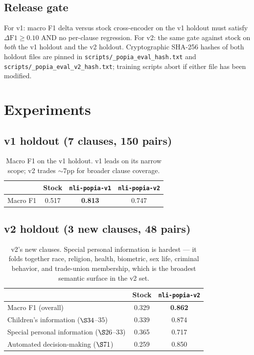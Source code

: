 \documentclass[11pt]{article}
\begin{document}
\subsection{Release gate}
For v1: macro F1 delta versus stock cross-encoder on the v1 holdout must satisfy $\Delta \mathrm{F1} \geq 0.10$ AND no per-clause regression. For v2: the same gate against stock on \emph{both} the v1 holdout and the v2 holdout. Cryptographic SHA-256 hashes of both holdout files are pinned in \texttt{scripts/\_popia\_eval\_hash.txt} and \texttt{scripts/\_popia\_eval\_v2\_hash.txt}; training scripts abort if either file has been modified.

\section{Experiments}
\label{sec:eval}

\subsection{v1 holdout (7 clauses, 150 pairs)}
\begin{table}[h]
\centering
\begin{tabular}{lccc}
\toprule
& Stock & \texttt{nli-popia-v1} & \texttt{nli-popia-v2} \\
\midrule
Macro F1 & 0.517 & \textbf{0.813} & 0.747 \\
\bottomrule
\end{tabular}
\caption{Macro F1 on the v1 holdout. v1 leads on its narrow scope; v2 trades $\sim$7pp for broader clause coverage.}
\end{table}

\subsection{v2 holdout (3 new clauses, 48 pairs)}
\begin{table}[h]
\centering
\begin{tabular}{lcc}
\toprule
& Stock & \texttt{nli-popia-v2} \\
\midrule
Macro F1 (overall) & 0.329 & \textbf{0.862} \\
\addlinespace
Children's information ($\S34$--$35$) & 0.339 & 0.874 \\
Special personal information ($\S26$--$33$) & 0.365 & 0.717 \\
Automated decision-making ($\S71$) & 0.259 & 0.850 \\
\bottomrule
\end{tabular}
\caption{v2's new clauses. Special personal information is hardest --- it folds together race, religion, health, biometric, sex life, criminal behavior, and trade-union membership, which is the broadest semantic surface in the v2 set.}
\end{table}
\end{document}
